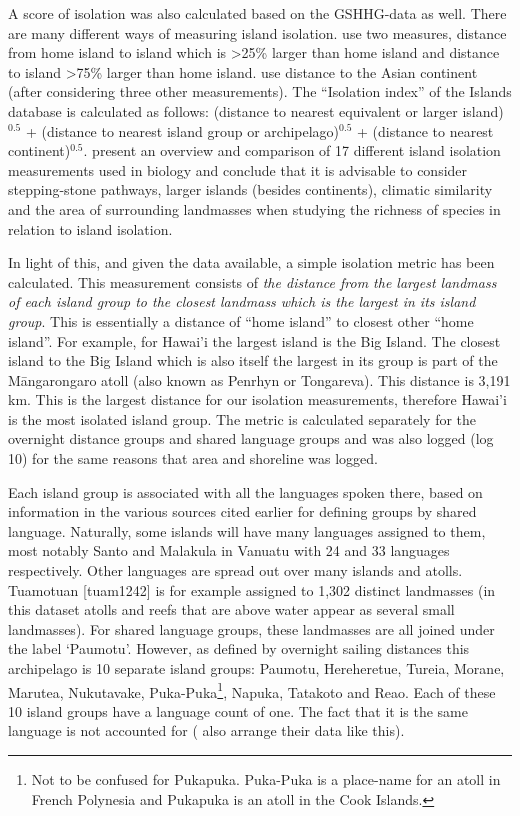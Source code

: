 \documentclass[a4paper,10pt]{article} %
\begin{document}
A score of isolation was also calculated based on the GSHHG-data as well. There are many different ways of measuring island isolation. \citet{rolett2004environmental} use two measures, distance from home island to island which is >25\% larger than home island and distance to island >75\% larger than home island. \citet{gavin2012island} use distance to the Asian continent (after considering three other measurements). The ``Isolation index'' of the Islands database \citep{dahl1991island}  is calculated as follows: (distance to nearest equivalent or larger island)$^{0.5}$ + (distance to nearest island group or archipelago)$^{0.5}$ + (distance to nearest continent)$^{0.5}$. \citet{weigelt_2013} present an overview and comparison of 17 different island isolation measurements used in biology and conclude that it is advisable to consider stepping-stone pathways, larger islands (besides continents), climatic similarity and the area of surrounding landmasses when studying the richness of species in relation to island isolation.

In light of this, and given the data available, a simple isolation metric has been calculated. This measurement consists of \textit{the distance from the largest landmass of each island group to the closest landmass which is the largest in its island group}. This is essentially a distance of ``home island'' to closest other ``home island''. For example, for Hawai'i the largest island is the Big Island. The closest island to the Big Island which is also itself the largest in its group is part of the M\={a}ngarongaro atoll (also known as Penrhyn or Tongareva). This distance is 3,191 km. This is the largest distance for our isolation measurements, therefore Hawai'i is the most isolated island group. The metric is calculated separately for the overnight distance groups and shared language groups and was also logged (log 10) for the same reasons that area and shoreline was logged.

Each island group is associated with all the languages spoken there, based on information in the various sources cited earlier for defining groups by shared language. Naturally, some islands will have many languages assigned to them, most notably Santo and Malakula in Vanuatu with 24 and 33 languages respectively. Other languages are spread out over many islands and atolls. Tuamotuan [tuam1242] is for example assigned to 1,302 distinct landmasses (in this dataset atolls and reefs that are above water appear as several small landmasses). For shared language groups, these landmasses are all joined under the label `Paumotu'. However, as defined by overnight sailing distances this archipelago is 10 separate island groups: Paumotu, Hereheretue, Tureia, Morane, Marutea, Nukutavake, Puka-Puka\footnote{Not to be confused for Pukapuka. Puka-Puka is a place-name for an atoll in French Polynesia and Pukapuka is an atoll in the Cook Islands.}, Napuka, Tatakoto and Reao. Each of these 10 island groups have a language count of one. The fact that it is the same language is not accounted for (\citet{gavin2012island} also arrange their data like this).
\end{document}
